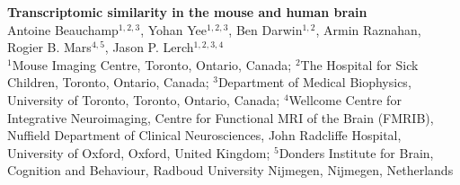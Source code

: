 
\LARGE{\textbf{Transcriptomic similarity in the mouse and human brain}}\\

\large
Antoine Beauchamp$^{1,2,3}$, Yohan Yee$^{1,2,3}$, Ben Darwin$^{1,2}$, Armin Raznahan, Rogier B. Mars$^{4,5}$, Jason P. Lerch$^{1,2,3,4}$\\

\small
$^1$Mouse Imaging Centre, Toronto, Ontario, Canada; $^2$The Hospital for Sick Children, Toronto, Ontario, Canada; $^3$Department of Medical Biophysics, University of Toronto, Toronto, Ontario, Canada; $^4$Wellcome Centre for Integrative Neuroimaging, Centre for Functional MRI of the Brain (FMRIB), Nuffield Department of Clinical Neurosciences, John Radcliffe Hospital, University of Oxford, Oxford, United Kingdom; $^5$Donders Institute for Brain, Cognition and Behaviour, Radboud University Nijmegen, Nijmegen, Netherlands

\normalsize
{}